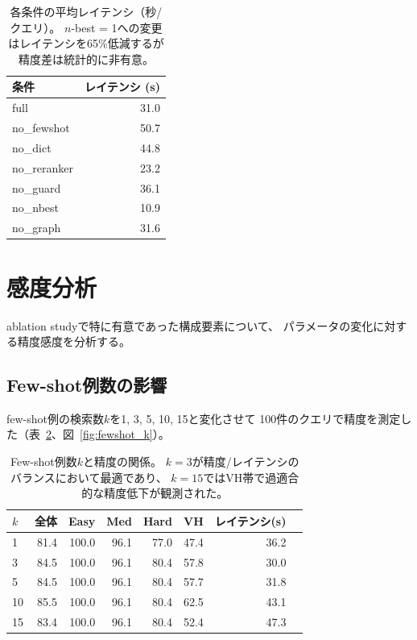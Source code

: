 \documentclass[5p,twocolumn]{elsarticle}
\begin{document}
\begin{table}[t]
\centering
\caption{各条件の平均レイテンシ（秒/クエリ）。
$n$-best = 1への変更はレイテンシを65\%低減するが精度差は統計的に非有意。}
\label{tab:latency}
\small
\begin{tabular}{@{}lr@{}}
\toprule
条件 & レイテンシ (s) \\
\midrule
full & 31.0 \\
no\_fewshot & 50.7 \\
no\_dict & 44.8 \\
no\_reranker & 23.2 \\
no\_guard & 36.1 \\
no\_nbest & 10.9 \\
no\_graph & 31.6 \\
\bottomrule
\end{tabular}
\end{table}

\section{感度分析}
\label{sec:sensitivity}

ablation studyで特に有意であった構成要素について、
パラメータの変化に対する精度感度を分析する。

\subsection{Few-shot例数の影響}
\label{sec:fewshot_sensitivity}

few-shot例の検索数$k$を1, 3, 5, 10, 15と変化させて
100件のクエリで精度を測定した（表~\ref{tab:fewshot_k}、図~\ref{fig:fewshot_k}）。

\begin{table}[t]
\centering
\caption{Few-shot例数$k$と精度の関係。
$k=3$が精度/レイテンシのバランスにおいて最適であり、
$k=15$ではVH帯で過適合的な精度低下が観測された。}
\label{tab:fewshot_k}
\small
\begin{tabular}{@{}lrrrrrrr@{}}
\toprule
$k$ & 全体 & Easy & Med & Hard & VH & レイテンシ(s) \\
\midrule
1  & 81.4 & 100.0 & 96.1 & 77.0 & 47.4 & 36.2 \\
3  & 84.5 & 100.0 & 96.1 & 80.4 & 57.8 & 30.0 \\
5  & 84.5 & 100.0 & 96.1 & 80.4 & 57.7 & 31.8 \\
10 & 85.5 & 100.0 & 96.1 & 80.4 & 62.5 & 43.1 \\
15 & 83.4 & 100.0 & 96.1 & 80.4 & 52.4 & 47.3 \\
\bottomrule
\end{tabular}
\end{table}
\end{document}
